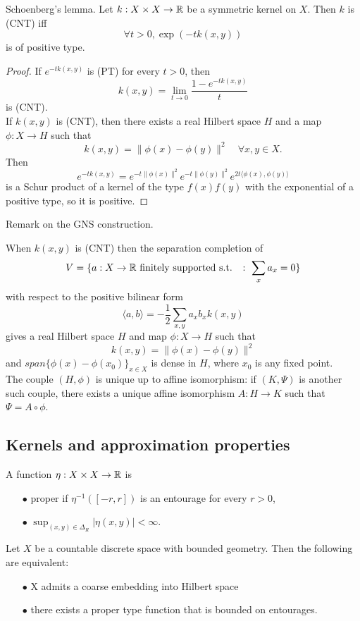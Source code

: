 \begin{thm} Schoenberg's lemma. Let $k: X\times X\rightarrow \mathbb R $ be a symmetric kernel on $X$. Then $k$ is (CNT) iff 
\[\forall t> 0 , \exp (-tk(x,y))\]
is of positive type.
\end{thm}

\begin{proof}
If $e^{-tk(x,y)}$ is (PT) for every $t>0$, then 
\[k(x,y) =\lim_{t\rightarrow 0} \frac{1-e^{-tk(x,y)}}{t}\]
is (CNT).\\

If $k(x,y)$ is (CNT), then there exists a real Hilbert space $H$ and a map $\phi: X \rightarrow H$ such that 
\[k(x,y) = \| \phi(x) - \phi(y) \|^2 \quad \forall x,y \in X.\]
Then
\[e^{-tk(x,y)} = e^{-t \| \phi(x) \|^2 } e^{-t \| \phi(y) \|^2 } e^{2t \langle \phi(x), \phi(y) \rangle } \]
is a Schur product of a kernel of the type $f(x)f(y)$ with the exponential of a positive type, so it is positive. 
\end{proof}

Remark on the GNS construction.

When $k(x,y)$ is (CNT) then the separation completion of 
\[V = \{a : X\rightarrow \mathbb R \text{ finitely supported s.t. }\ : \ \sum_x a_x = 0\}\]
with respect to the positive bilinear form 
\[\langle a, b \rangle = -\frac{1}{2}\sum_{x,y} a_x b_x k(x,y) \]
gives a real Hilbert space $H$ and map $\phi: X \rightarrow H$ such that 
\[k(x,y) = \| \phi(x)-\phi(y) \|^2 \]
and $span\{\phi(x) - \phi(x_0)\}_{x\in X} $ is dense in $H$, where $x_0$ is any fixed point.\\ 

The couple $(H, \phi)$ is unique up to affine isomorphism: if $(K, \Psi)$ is another such couple, there exists a unique affine isomorphism $A: H \rightarrow K$ such that $\Psi =A\circ \phi $. 
 
\subsection{Kernels and approximation properties}

A function $\eta: X\times X \rightarrow \mathbb R$ is
\begin{itemize}
\item[$\bullet$] proper if $\eta^{-1}([-r,r])$ is an entourage for every $r>0$,
\item[$\bullet$] $\sup_{(x,y)\in \Delta_R} | \eta(x,y) | < \infty$.
\end{itemize}

\begin{thm}
Let $X$ be a countable discrete space with bounded geometry. Then the following are equivalent:
\begin{itemize}
\item[$\bullet$] X admits a coarse embedding into Hilbert space
\item[$\bullet$] there exists a proper  type function that is bounded on entourages.
\end{itemize}
\end{thm}

